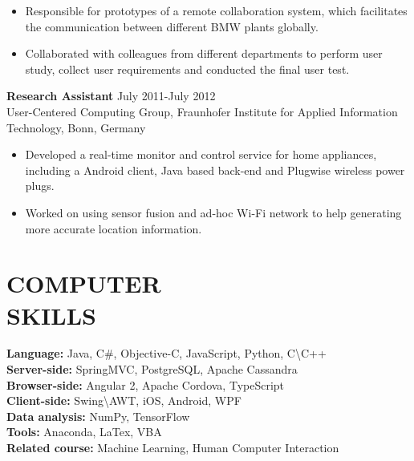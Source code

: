 \documentclass[margin, 10pt]{res} %
\begin{document}
\begin{resume}
\begin{CJK}{UTF8}{gbsn}
\begin{itemize} \itemsep -2pt %
\item Responsible for prototypes of a remote collaboration system, which facilitates the communication between different BMW plants globally.
\item Collaborated with colleagues from different departments to perform user study, collect user requirements and conducted the final user test.
\end{itemize}
 
\textbf{Research Assistant} \hfill July 2011-July 2012 \\
User-Centered Computing Group, Fraunhofer Institute for Applied Information Technology, Bonn, Germany
\begin{itemize}  \itemsep -2pt %
\item Developed a real-time monitor and control service for home appliances, including a Android client, Java based back-end and Plugwise wireless power plugs.
\item Worked on using sensor fusion and ad-hoc Wi-Fi network to help generating more accurate location information.
\end{itemize} 


\section{COMPUTER \\ SKILLS}
\textbf{Language: }Java, C\#, Objective-C, JavaScript, Python, C\textbackslash C++\\
\textbf{Server-side: }SpringMVC, PostgreSQL, Apache Cassandra\\
\textbf{Browser-side: }Angular 2, Apache Cordova, TypeScript\\
\textbf{Client-side: }Swing\textbackslash AWT, iOS, Android, WPF\\
\textbf{Data analysis: }NumPy, TensorFlow\\
\textbf{Tools: }Anaconda, LaTex, VBA\\
\textbf{Related course:} Machine Learning, Human Computer Interaction


\end{CJK}
\end{resume}
\end{document}
